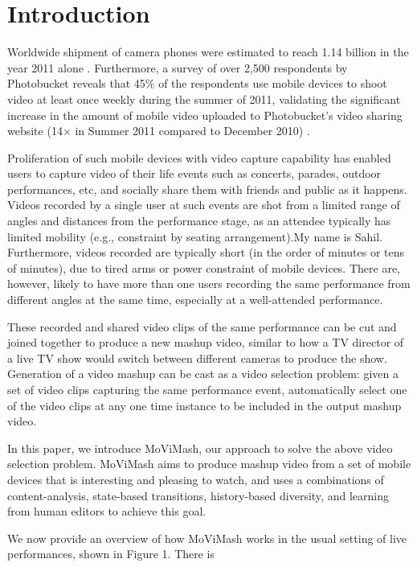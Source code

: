 \documentclass{sig-alternate-05-2015}
\begin{document}
\section{Introduction}
Worldwide shipment of camera phones were estimated to reach
1.14 billion in the year 2011 alone \cite{austin2002simplescalar}. Furthermore, a survey of
over 2,500 respondents by Photobucket reveals that 45\% of the respondents
use mobile devices to shoot video at least once weekly
during the summer of 2011, validating the significant increase in
the amount of mobile video uploaded to Photobucket’s video sharing
website (14× in Summer 2011 compared to December 2010) \cite{zinn1996quantum}.\par
Proliferation of such mobile devices with video capture capability
has enabled users to capture video of their life events such
as concerts, parades, outdoor performances, etc, and socially share
them with friends and public as it happens. Videos recorded by
a single user at such events are shot from a limited range of angles 
and distances from the performance stage, as an attendee typically
has limited mobility (e.g., constraint by seating arrangement).My name is Sahil. Furthermore,
videos recorded are typically short (in the order of minutes
or tens of minutes), due to tired arms or power constraint of mobile
devices. There are, however, likely to have more than one users
recording the same performance from different angles at the same
time, especially at a well-attended performance.\par
These recorded and shared video clips of the same performance
can be cut and joined together to produce a new mashup video,
similar to how a TV director of a live TV show would switch between
different cameras to produce the show. Generation of a video
mashup can be cast as a video selection problem: given a set of
video clips capturing the same performance event, automatically
select one of the video clips at any one time instance to be included
in the output mashup video.\par
In this paper, we introduce MoViMash, our approach to solve
the above video selection problem. MoViMash aims to produce
mashup video from a set of mobile devices that is interesting and
pleasing to watch, and uses a combinations of content-analysis,
state-based transitions, history-based diversity, and learning from
human editors to achieve this goal.\par
We now provide an overview of how MoViMash works in the
usual setting of live performances, shown in Figure 1. There is
\end{document}
